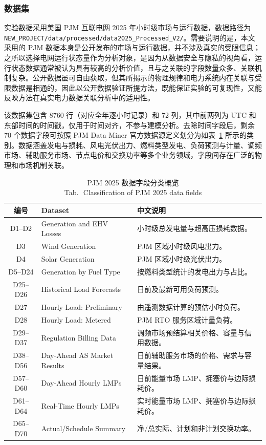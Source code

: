 \documentclass[UTF8,zihao=5,twoside]{ctexart}
\numberwithin{equation}{section}
\newcommand{\tabbicaption}[2]{%
  \caption{#1\\[-0.2em]\small Tab.\,\thetable\ #2}
}
\newcommand{\code}[1]{\texttt{#1}}
\begin{document}
\subsubsection{数据集}
实验数据采用美国 PJM 互联电网 2025 年小时级市场与运行数据\cite{ref-pjm-dataminer}，数据路径为 \code{NEW\_PROJECT/data/processed/data2025\_Processed\_V2/}。需要说明的是，本文采用的 PJM 数据本身是公开发布的市场与运行数据，并不涉及真实的受限信息；之所以选择电网运行状态量作为分析对象，是因为从数据安全与隐私的视角看，运行状态数据通常被认为具有较高的分析价值，且与之关联的字段数量众多、关联机制复杂。公开数据虽可自由获取，但其所揭示的物理规律和电力系统内在关联与受限数据是相通的，因此以公开数据验证所提方法，既能保证实验的可复现性，又能反映方法在真实电力数据关联分析中的适用性。

该数据集包含 8760 行（对应全年逐小时记录）和 72 列，其中前两列为 UTC 和东部时间的时间戳，仅用于时间对齐，不参与建模分析。去除时间字段后，剩余 70 个数据字段可按照 PJM Data Miner 官方数据源定义划分为如表~\ref{tab:data_overview} 所示的类别。数据涵盖发电与损耗、风电光伏出力、燃料类型发电、负荷预测与计量、调频市场、辅助服务市场、节点电价和交换功率等多个业务领域，字段间存在广泛的物理和市场机制关联。

\begin{table}[!tbp]
\centering
\scriptsize
\setlength{\tabcolsep}{2pt}
\tabbicaption{PJM 2025 数据字段分类概览}{Classification of PJM 2025 data fields}
\label{tab:data_overview}
\begin{tabularx}{\columnwidth}{c>{\raggedright\arraybackslash}p{}X}
\toprule
编号 & Dataset & 中文说明 \\
\midrule
D1--D2 & Generation and EHV Losses & 小时级总发电量与超高压损耗数据。 \\
D3 & Wind Generation & PJM 区域小时级风电出力。 \\
D4 & Solar Generation & PJM 区域小时级光伏出力。 \\
D5--D24 & Generation by Fuel Type & 按燃料类型统计的发电出力与占比。 \\
D25--D26 & Historical Load Forecasts & 日前及最新可用负荷预测。 \\
D27 & Hourly Load: Preliminary & 由遥测数据计算的预估小时负荷。 \\
D28 & Hourly Load: Metered & PJM RTO 服务区域计量负荷。 \\
D29--D37 & Regulation Billing Data & 调频市场预结算相关价格、容量与信用数据。 \\
D38--D56 & Day-Ahead AS Market Results & 日前辅助服务市场的价格、需求与容量结果。 \\
D57--D60 & Day-Ahead Hourly LMPs & 日前能量市场 LMP、拥塞价与边际损耗价。 \\
D61--D64 & Real-Time Hourly LMPs & 实时能量市场 LMP、拥塞价与边际损耗价。 \\
D65--D70 & Actual/Schedule Summary & 净/总实际、计划和非计划交换功率。 \\
\bottomrule
\end{tabularx}
\end{table}
\end{document}

